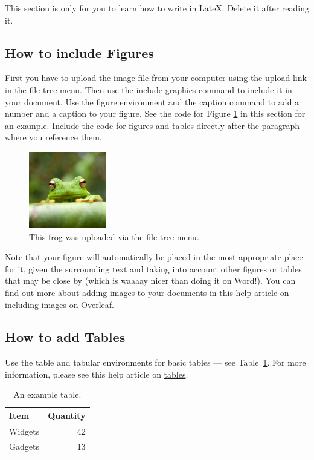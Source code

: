 \documentclass{article}
\begin{document}
This section is only for you to learn how to write in LateX. Delete it after reading it.


\subsection{How to include Figures}

First you have to upload the image file from your computer using the upload link in the file-tree menu.
Then use the include graphics command to include it in your document.
Use the figure environment and the caption command to add a number and a caption to your figure.
See the code for Figure \ref{fig:frog} in this section for an example. Include the code for figures
and tables directly after the paragraph where you reference them.

\begin{figure}[tb]
\centering
\includegraphics[width=0.3\textwidth]{frog.jpg}
\caption{\label{fig:frog}This frog was uploaded via the file-tree menu.}
\end{figure}

Note that your figure will automatically be placed in the most appropriate place for it,
given the surrounding text and taking into account other figures or tables that may be close by
(which is waaaay nicer than doing it on Word!).
You can find out more about adding images to your documents in this help article on
\href{https://www.overleaf.com/learn/how-to/Including_images_on_Overleaf}{including images on Overleaf}.



\subsection{How to add Tables}

Use the table and tabular environments for basic tables --- see Table~\ref{tab:widgets}.
For more information, please see this help article on \href{https://www.overleaf.com/learn/latex/tables}{tables}.

\begin{table}[tb]
\centering
\begin{tabular}{l|r}
Item & Quantity \\\hline
Widgets & 42 \\
Gadgets & 13
\end{tabular}
\caption{\label{tab:widgets}An example table.}
\end{table}
\end{document}
